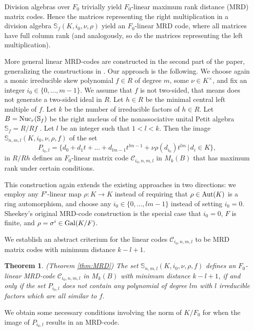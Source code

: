 \documentclass[12pt]{amsart}
\theoremstyle{plain}
\newtheorem*{theorem*}{Theorem}
\theoremstyle{definition}
\numberwithin{equation}{section}
\numberwithin{figure}{section}
\begin{document}
Division algebras over $F_0$  trivially yield $F_0$-linear maximum rank distance (MRD) matrix  codes. Hence
the matrices representing the right  multiplication in a division algebra $\mathbb{S}_f(K,i_0,\nu,\rho)$  yield an $F_0$-linear MRD code, where all matrices have full column rank (and analogously, so do the matrices representing the left  multiplication).

More general linear MRD-codes are constructed in the second part of the paper,  generalizing the constructions  in \cite{NewS, PT2, Sheekey}.
Our approach is the following. We choose again a monic irreducible skew polynomial $f\in R$  of degree $m$, some $\nu\in K^\times$, and fix an integer $i_0\in \{0,\dots, m-1\}$. We assume that $f$ is not two-sided, that means does not generate a two-sided ideal in $R$.
 Let $h\in R$ be the minimal central left multiple
 of $f$. Let $k$ be the number of irreducible factors of $h\in R$. Let $B={\rm Nuc}_r(\mathbb{S}_f)$ be the right nucleus of the nonassociative unital Petit algebra $\mathbb{S}_f=R/Rf$ \cite{P66}. Let $l$ be an integer such that  $1<l<k$.
Then the image $\mathbb{S}_{n,m,l}(K,i_0,\nu,\rho, f)$ of the set
 $$P_{i_0,l}=\lbrace d_0+d_1t+\dots+d_{lm-1}t^{lm-1}+\nu\rho(d_{i_0})t^{lm}\,|\, d_i\in K \rbrace,$$
in $R/Rh$ defines an $F_0$-linear matrix code $\mathcal{C}_{i_0, n,m,l}$ in  $M_{k}(B)$ that has maximum rank under certain conditions.

 This construction again extends the existing approaches in two directions: we employ any  $F'$-linear map $\rho:K\to K$ instead of requiring that  $\rho\in {\rm Aut}(K)$ is a ring automorphism, and choose any $i_0\in\{0,\dots,lm-1\}$ instead of setting $i_0=0$.
 Sheekey's original MRD-code construction is the special case that $i_0=0$, $F$ is finite, and $\rho=\sigma^i\in {\rm Gal}(K/F)$.


We  establish an abstract criterium for the linear codes $\mathcal{C}_{i_0, n,m,l}$ to be   MRD matrix codes
with minimum distance $k-l+1$.

\begin{theorem*} (Theorem \ref{thm:MRD})
The set
$\mathbb{S}_{n,m,l}(K,i_0,\nu,\rho, f)$  defines an $F_0$-linear MRD-code $\mathcal{C}_{i_0, n,m,l}$  in $M_{k}(B)$
 with minimum distance $k-l+1$, if and only if the set $P_{i_0,l}$ does not contain any polynomial of degree $lm$ with $l$ irreducible factors which are all similar to $f$.
\end{theorem*}


We obtain some necessary conditions involving the norm of $K/F_0$ for when the image of $P_{i_0,l}$ results in an MRD-code.
\end{document}

